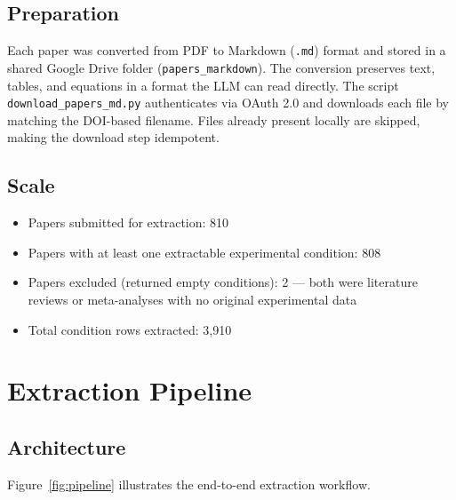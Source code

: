\documentclass[11pt,a4paper]{article}
\begin{document}
\subsection{Preparation}

Each paper was converted from PDF to Markdown (\texttt{.md}) format and stored in a shared Google Drive folder (\texttt{papers\_markdown}). The conversion preserves text, tables, and equations in a format the LLM can read directly. The script \texttt{download\_papers\_md.py} authenticates via OAuth 2.0 and downloads each file by matching the DOI-based filename. Files already present locally are skipped, making the download step idempotent.

\subsection{Scale}

\begin{itemize}[noitemsep]
  \item Papers submitted for extraction: 810
  \item Papers with at least one extractable experimental condition: 808
  \item Papers excluded (returned empty conditions): 2 — both were literature reviews or meta-analyses with no original experimental data
  \item Total condition rows extracted: 3{,}910
\end{itemize}

\section{Extraction Pipeline}
\label{sec:pipeline}

\subsection{Architecture}

Figure~\ref{fig:pipeline} illustrates the end-to-end extraction workflow.
\end{document}
